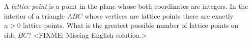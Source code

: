 \problem{}
A \emph{lattice point} is a point in the plane whose both coordinates
are integers.
In the interior of a triangle $ABC$ whose vertices are lattice points there are
exactly $n > 0$ lattice points.
What is the greatest possible number of lattice points on side $BC$?
\solution
<FIXME: Missing English solution.>
\endproblem

